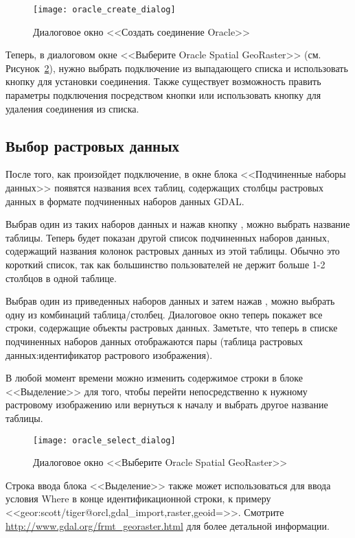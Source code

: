 \begin{figure}[ht]
   \centering
   \texttt{[image: oracle\_create\_dialog]}
   \caption{Диалоговое окно <<Создать соединение Oracle>> \nixcaption}\label{fig:oracle_create}
\end{figure}

Теперь, в диалоговом окне <<Выберите Oracle Spatial GeoRaster>>
(см. Рисунок~\ref{fig:oracle_select}), нужно выбрать подключение из
выпадающего списка и использовать кнопку  для
установки соединения. Также существует возможность править параметры
подключения посредством кнопки  или использовать кнопку
 для удаления соединения из списка.

\subsection{Выбор растровых данных}

После того, как произойдет подключение, в окне блока <<Подчиненные
наборы данных>> появятся названия всех таблиц, содержащих столбцы
растровых данных в формате подчиненных наборов данных GDAL.

Выбрав один из таких наборов данных и нажав кнопку , можно
выбрать название таблицы. Теперь будет показан другой список подчиненных
наборов данных, содержащий названия колонок растровых данных из этой
таблицы. Обычно это короткий список, так как большинство пользователей
не держит больше 1-2 столбцов в одной таблице.

Выбрав один из приведенных наборов данных и затем нажав ,
можно выбрать одну из комбинаций таблица/столбец. Диалоговое окно теперь
покажет все строки, содержащие объекты растровых данных. Заметьте, что
теперь в списке подчиненных наборов данных отображаются пары (таблица
растровых данных:идентификатор растрового изображения).

В любой момент времени можно изменить содержимое строки в блоке
<<Выделение>> для того, чтобы перейти непосредственно к нужному
растровому изображению или вернуться к началу и выбрать другое название
таблицы.

\begin{figure}[ht]
   \centering
   \texttt{[image: oracle\_select\_dialog]}
   \caption{Диалоговое окно <<Выберите Oracle Spatial GeoRaster>> \nixcaption}\label{fig:oracle_select}
\end{figure}

Строка ввода блока <<Выделение>> также может использоваться для ввода
условия Where в конце идентификационной строки, к примеру
<<geor:scott/tiger@orcl,gdal\_import,raster,geoid=>>. Смотрите \\
\url{http://www.gdal.org/frmt_georaster.html} для более детальной
информации.

